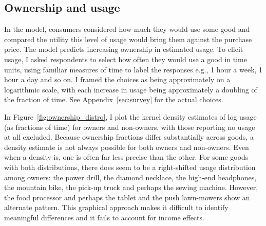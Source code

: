 \documentclass[11pt]{article}
\begin{document}


\subsection{Ownership and usage} 
In the model, consumers considered how much they would use some good and compared the utility this level of usage would bring them against the purchase price. 
The model predicts increasing ownership in estimated usage. 
To elicit usage, I asked respondents to select how often they would use a good in time units, using familiar measures of time to label the responses e.g., 1 hour a week, 1 hour a day and so on.
I framed the choices as being approximately on a logarithmic scale, with each increase in usage being approximately a doubling of the fraction of time. See Appendix~\ref{sec:survey} for the actual choices.   

In Figure~\ref{fig:ownership_distro}, I plot the kernel density estimates of log usage (as fractions of time) for owners and non-owners, with those reporting no usage at all excluded. 
Because ownership fractions differ substantially across goods, a density estimate is not always possible for both owners and non-owners. 
Even when a density is, one is often far less precise than the other. 
For some goods with both distributions, there does seem to be a right-shifted usage distribution among owners: 
the power drill, the diamond necklace, the high-end headphones, the mountain bike, the pick-up truck and perhaps the sewing machine. 
However, the food processor and perhaps the tablet and the push lawn-mowers show an alternate pattern. 
This graphical approach makes it difficult to identify meaningful differences and it fails to account for income effects. 
\end{document}
